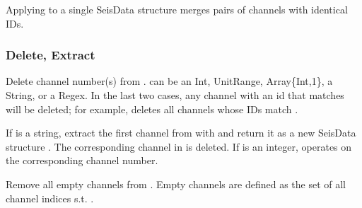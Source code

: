 \documentclass[letterpaper,11pt,english]{sphinxmanual}
\begin{document}
Applying  to a single SeisData structure merges pairs of channels with identical IDs.


\subsubsection{Delete, Extract}
\label{\detokenize{src/seisdata:delete-extract}}

\begin{fulllineitems}
\end{fulllineitems}



\begin{fulllineitems}
\end{fulllineitems}



\begin{fulllineitems}
\end{fulllineitems}


Delete channel number(s)  from .  can be an Int, UnitRange, Array\{Int,1\}, a String, or a Regex. In the last two cases, any channel with an id that matches  will be deleted; for example,  deletes all channels whose IDs match .


\begin{fulllineitems}
\end{fulllineitems}


If  is a string, extract the first channel from  with  and return it as a new SeisData structure . The corresponding channel in  is deleted. If  is an integer,  operates on the corresponding channel number.


\begin{fulllineitems}
\end{fulllineitems}


Remove all empty channels from . Empty channels are defined as the set of all channel indices  s.t. .
\end{document}
